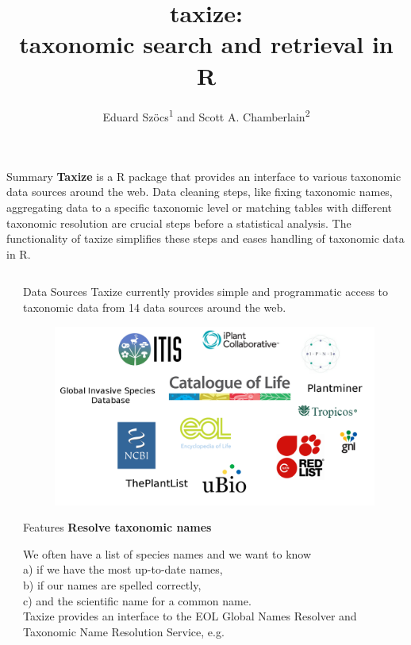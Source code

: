\documentclass[final,t]{beamer}\usepackage[]{graphicx}\usepackage[]{color}
\title{taxize: \\[0.2em] taxonomic search and retrieval in R}
\author{Eduard Szöcs\textsuperscript{1} and Scott A. Chamberlain\textsuperscript{2}}
\institute{\textsuperscript{1}University of Koblenz-Landau, \textsuperscript{2}rOpenSci}
\begin{document}
  \begin{frame}[fragile]

		\begin{block}{\Large Summary}
    \Large \textcolor{i6bluedark}{\textbf{Taxize}} is a R package that provides an interface to various taxonomic data sources around the web.
    Data cleaning steps, like fixing taxonomic names, aggregating data to a specific taxonomic level or matching tables with different taxonomic resolution are crucial steps before a statistical analysis. 
    The functionality of taxize simplifies these steps and eases handling of taxonomic data in R. 
    
		\end{block}

	\begin{columns}[t]
		\begin{column}{0.01\linewidth}
		\end{column}

		\begin{column}{.49\linewidth}
			\vspace{-\baselineskip}  %
			\begin{block}{Data Sources}
        Taxize currently provides simple and programmatic access to taxonomic data from 14 data sources around the web.
        \vspace{0.5cm}
				\begin{figure}
					\includegraphics[width=0.8\linewidth]{fig/sources.png}
					\label{fig:sources}
				\end{figure}
			\end{block}

			\begin{block}{Features}
				\textcolor{i6bluedark}{\textbf{\large Resolve taxonomic names}}
        \vspace{0.5em}
        \par
        \begingroup
        \leftskip=2cm
        \noindent 
          We often have a list of species names and we want to know \\
          a) if we have the most up-to-date names, \\
          b) if our names are spelled correctly,  \\
          c) and the scientific name for a common name.\\
          Taxize provides an interface to the EOL Global Names Resolver and Taxonomic Name Resolution Service, e.g.
        \par
        \endgroup


\end{block}
\end{column}
\end{columns}
\end{frame}
\end{document}

